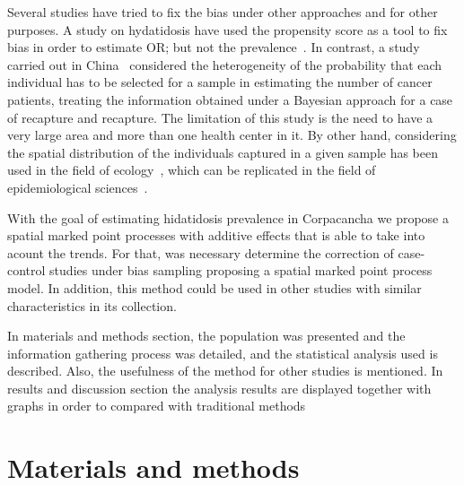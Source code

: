 \documentclass[10pt,letterpaper]{article}
\begin{document}
Several studies have tried to fix the bias under other approaches and for other purposes. A study on hydatidosis have used the propensity score as a tool to fix bias in order to estimate OR; but not the prevalence~\cite{malki2014}. In contrast, a study carried out in China~\cite{bailly2015bayesian} considered the heterogeneity of the probability that each individual has to be selected for a sample in estimating the number of cancer patients, treating the information obtained under a Bayesian approach for a case of recapture and recapture. The limitation of this study is the need to have a very large area and more than one health center in it. By other hand, considering the spatial distribution of the individuals captured in a given sample has been used in the field of ecology~\cite{Royle2014Spatial}, which can be replicated in the field of epidemiological sciences~\cite{braeye2016capture}.

With the goal of estimating hidatidosis prevalence in Corpacancha we propose a spatial marked point processes with additive effects that is able to take into acount the trends. For that, was necessary determine the correction of case-control studies under bias sampling proposing a spatial marked point process model. In addition, this method could be used in other studies with similar characteristics in its collection.

In materials and methods section, the population was presented and the information gathering process was detailed, and the statistical analysis used is described. Also, the usefulness of the method for other studies is mentioned.
In results and discussion section the analysis results are displayed together with graphs in order to compared with traditional methods

\section*{Materials and methods}
\end{document}
